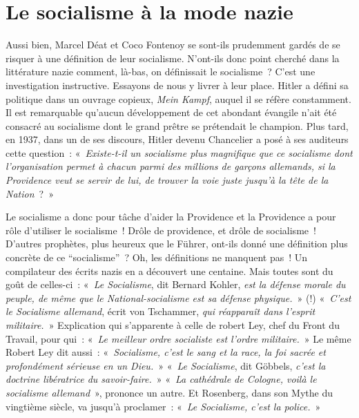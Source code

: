 \documentclass[french,twoside]{book} %
\begin{document}
\section[Le socialisme à la mode nazie]{Le socialisme à la mode nazie}
\noindent Aussi bien, Marcel Déat et Coco Fontenoy se sont-ils prudemment gardés de se risquer à une définition de leur   socialisme. N’ont-ils donc point cherché dans la littérature nazie comment, là-bas, on définissait le socialisme ? C’est une investigation instructive. Essayons de nous y livrer à leur place. Hitler a défini sa politique dans un ouvrage copieux, \emph{Mein Kampf}, auquel il se réfère constamment. Il est remarquable qu’aucun développement de cet abondant évangile n’ait été consacré au socialisme dont le grand prêtre se prétendait le champion. Plus tard, en 1937, dans un de ses discours, Hitler devenu Chancelier a posé à ses auditeurs cette question : « \emph{Existe-t-il un socialisme plus magnifique que ce socialisme dont l’organisation permet à chacun parmi des millions de garçons allemands, si la Providence veut se servir de lui, de trouver la voie juste jusqu’à la tête de la Nation} ? »\par
Le socialisme a donc pour tâche d’aider la Providence et la Providence a pour rôle d’utiliser le socialisme ! Drôle de providence, et drôle de socialisme ! D’autres prophètes, plus heureux que le Führer, ont-ils donné une définition plus concrète de ce “socialisme” ? Oh, les définitions ne manquent pas ! Un compilateur des écrits nazis en a découvert une centaine. Mais toutes sont du goût de celles-ci : « \emph{Le Socialisme}, dit Bernard Kohler, \emph{est la défense morale du peuple, de même que le National-socialisme est sa défense physique.} » (!) « \emph{C’est le Socialisme allemand}, écrit von Tschammer, \emph{qui réapparaît dans l’esprit militaire.} » Explication qui s’apparente à celle de robert Ley, chef du Front du Travail, pour qui : « \emph{Le meilleur ordre socialiste est l’ordre militaire.} » Le même Robert Ley dit aussi : « \emph{Socialisme, c’est le sang et la race, la foi sacrée et profondément sérieuse en un Dieu.} » « \emph{Le Socialisme}, dit Göbbels, \emph{c’est la doctrine libératrice du savoir-faire.} » « \emph{La cathédrale de Cologne, voilà le socialisme allemand} », prononce un autre. Et Rosenberg, dans son Mythe du vingtième siècle, va jusqu’à proclamer : « \emph{Le Socialisme, c’est la police.} »\par
\end{document}
